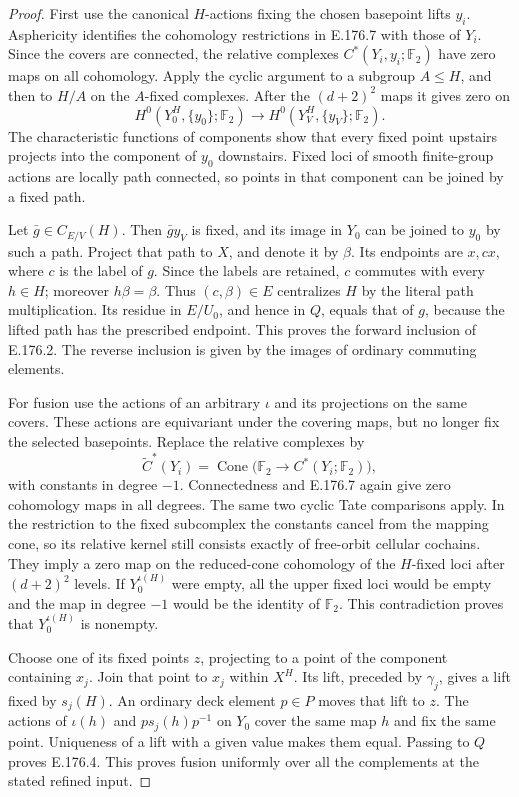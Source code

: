 \begin{proof}
First use the canonical \(H\)-actions fixing the chosen
basepoint lifts \(y_i\).  Asphericity identifies the
cohomology restrictions in E.176.7 with those of \(Y_i\).
Since the covers are connected, the relative complexes
\(C^*(Y_i,y_i;\mathbb F_2)\) have zero maps on all
cohomology.  Apply the cyclic argument to a subgroup
\(A\leq H\), and then to \(H/A\) on the \(A\)-fixed
complexes.  After the \((d+2)^2\) maps it gives zero on
\[
 H^0(Y_0^H,\{y_0\};\mathbb F_2)
                  \longrightarrow H^0(Y_V^H,\{y_V\};\mathbb F_2).
\tag{E.176.8}
\]
The characteristic functions of components show that
every fixed point upstairs projects into the component
of \(y_0\) downstairs.  Fixed loci of smooth finite-group
actions are locally path connected, so points in that
component can be joined by a fixed path.

Let \(\bar g\in C_{E/V}(H)\).  Then \(\bar g y_V\) is
fixed, and its image in \(Y_0\) can be joined to \(y_0\)
by such a path.  Project that path to \(X\), and denote
it by \(\beta\).  Its endpoints are \(x,cx\), where \(c\)
is the label of \(g\).  Since the labels are retained,
\(c\) commutes with every \(h\in H\); moreover \(h\beta=\beta\).
Thus \((c,\beta)\in E\) centralizes \(H\) by the literal
path multiplication.  Its residue in \(E/U_0\), and
hence in \(Q\), equals that of \(g\), because the lifted
path has the prescribed endpoint.  This proves the
forward inclusion of E.176.2.  The reverse inclusion
is given by the images of ordinary commuting elements.

For fusion use the actions of an arbitrary \(\iota\)
and its projections on the same covers.  These actions
are equivariant under the covering maps, but no longer
fix the selected basepoints.  Replace the relative
complexes by
\[
 \widetilde C^*(Y_i)
      =\operatorname{Cone}\bigl(\mathbb F_2
                                 \longrightarrow C^*(Y_i;\mathbb F_2)\bigr),
\tag{E.176.9}
\]
with constants in degree \(-1\).  Connectedness and
E.176.7 again give zero cohomology maps in all degrees.
The same two cyclic Tate comparisons apply.
In the restriction to the fixed subcomplex the constants
cancel from the mapping cone, so its relative kernel
still consists exactly of free-orbit cellular cochains.
They imply a zero map on the reduced-cone cohomology
of the \(H\)-fixed loci after \((d+2)^2\) levels.
If \(Y_0^{\iota(H)}\) were empty, all the upper fixed
loci would be empty and the map in degree \(-1\)
would be the identity of \(\mathbb F_2\).  This
contradiction proves that \(Y_0^{\iota(H)}\) is nonempty.

Choose one of its fixed points \(z\), projecting to a
point of the component containing \(x_j\).  Join that
point to \(x_j\) within \(X^H\).  Its lift, preceded by
\(\gamma_j\), gives a lift fixed by \(s_j(H)\).
An ordinary deck element \(p\in P\) moves that lift to
\(z\).  The actions of \(\iota(h)\) and
\(p s_j(h)p^{-1}\) on \(Y_0\) cover the same map \(h\)
and fix the same point.  Uniqueness of a lift with a
given value makes them equal.  Passing to \(Q\)
proves E.176.4.  This proves fusion uniformly over
all the complements at the stated refined input.
\end{proof}
